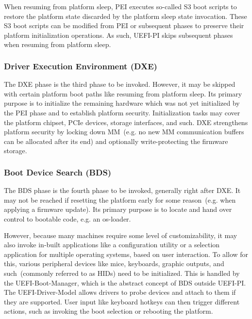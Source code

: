 When resuming from platform sleep, \gls{PEI} executes so-called S3 boot scripts to restore the platform state discarded by the platform sleep state invocation. These S3 boot scripts can be modified from \gls{PEI} or subsequent phases to preserve their platform initialization operations. As such, \gls{UEFI-PI} skips subsequent phases when resuming from platform sleep.

\subsubsection{Driver Execution Environment (DXE)}

The \gls{DXE} phase is the third phase to be invoked. However, it may be skipped with certain platform boot paths like resuming from platform sleep. Its primary purpose is to initialize the remaining hardware which was not yet initialized by the \gls{PEI} phase and to establish platform security. Initialization tasks may cover the platform chipset, PCIe devices, storage interfaces, and such. \gls{DXE} strengthens platform security by locking down \gls{MM}~(e.g. no new \gls{MM} communication buffers can be allocated after its end) and optionally write-protecting the firmware storage.

\subsubsection{Boot Device Search (BDS)}

The \gls{BDS} phase is the fourth phase to be invoked, generally right after \gls{DXE}. It may not be reached if resetting the platform early for some reason~(e.g. when applying a \gls{firmware} update). Its primary purpose is to locate and hand over control to bootable code, e.g. an \gls{os-loader}.

However, because many machines require some level of customizability, it may also invoke in-built applications like a configuration utility or a selection application for multiple operating systems, based on user interaction. To allow for this, various peripheral devices like mice, keyboards, graphic outputs, and such~(commonly referred to as \glspl{HID}) need to be initialized. This is handled by the \gls{UEFI-Boot-Manager}, which is the abstract concept of \gls{BDS} outside \gls{UEFI-PI}. The \gls{UEFI-Driver-Model} allows drivers to probe devices and attach to them if they are supported. User input like keyboard hotkeys can then trigger different actions, such as invoking the boot selection or rebooting the platform.

